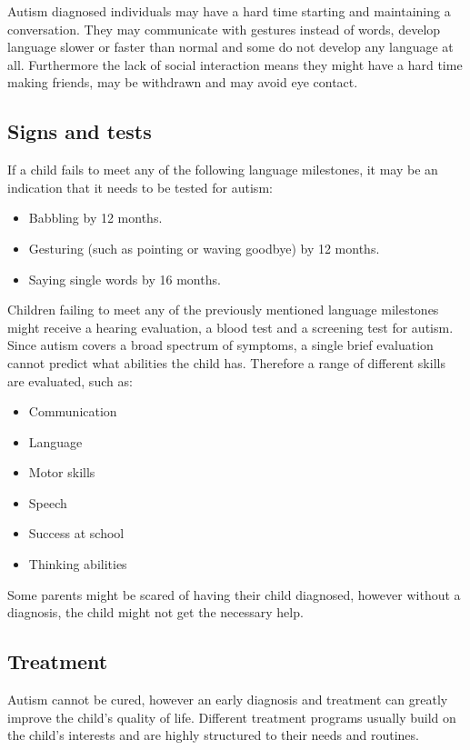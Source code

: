 Autism diagnosed individuals may have a hard time starting and maintaining a conversation. They may communicate with gestures instead of words, develop language slower or faster than normal and some do not develop any language at all.
Furthermore the lack of social interaction means they might have a hard time making friends, may be withdrawn and may avoid eye contact.\citep{autism}

\subsection*{Signs and tests}
\label{sub:signsAndTests}
If a child fails to meet any of the following language milestones, it may be an indication that it needs to be tested for autism:

\begin{itemize}
\item Babbling by 12 months.
\item Gesturing (such as pointing or waving goodbye) by 12 months.
\item Saying single words by 16 months.
\end{itemize}

Children failing to meet any of the previously mentioned language milestones might receive a hearing evaluation, a blood test and a screening test for autism. Since autism covers a broad spectrum of symptoms, a single brief evaluation cannot predict what abilities the child has. Therefore a range of different skills are evaluated, such as:

\begin{itemize}
\item Communication
\item Language
\item Motor skills
\item Speech
\item Success at school
\item Thinking abilities
\end{itemize}

Some parents might be scared of having their child diagnosed, %
however without a diagnosis, the child might not get the necessary help.\citep{autism}

\subsection*{Treatment}
\label{sub:treatment}
Autism cannot be cured, however an early diagnosis and treatment can greatly improve the child's quality of life. Different treatment programs usually build on the child's interests and are highly structured to their needs and routines.\citep{autism}
